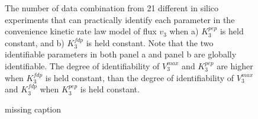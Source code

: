 \documentclass[10pt]{article}
\begin{document}
	\begin{figure}[!tbhp]
		\caption{The number of data combination from 21 different in silico experiments that can practically identify each parameter in the convenience kinetic rate law model of flux $v_3$ when a) $K_3^{pep}$ is held constant, and b) $K_3^{fdp}$ is held constant. Note that the two identifiable parameters in both panel a and panel b are globally identifiable. The degree of identifiability of $V_3^{max}$ and $K_3^{pep}$ are higher when $K_3^{fdp}$ is held constant, than the degree of identifiability of $V_3^{max}$ and $K_3^{fdp}$ when $K_3^{pep}$ is held constant.}\label{fig:ident_v3_var}
	\end{figure} 
	
	\begin{figure}[!tbhp]
		\caption{missing caption}\label{fig:v3_exp_info}
	\end{figure} 
\end{document}
